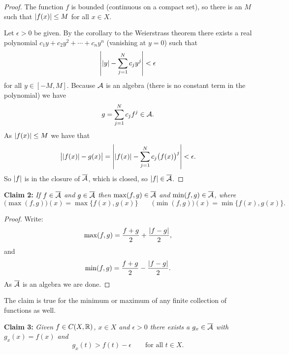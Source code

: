 \begin{proof}
The function $f$ is bounded (continuous on a compact set), so there is an $M$
such that $\lvert {f(x)} \rvert \leq M$ for all $x \in X$.

Let $\epsilon > 0$ be given.  By the corollary to the Weierstrass theorem there
exists a real polynomial $c_1 y + c_2 y^2 + \cdots+ c_n y^n$ (vanishing at
$y=0$) such that
\begin{equation*}
\left\lvert {\lvert {y} \rvert - \sum_{j=1}^N c_j y^j} \right\rvert < \epsilon
\end{equation*}
for all $y \in [-M,M]$.
Because ${\mathcal{A}}$ is an algebra (there is no constant term in the polynomial)
we have
\begin{equation*}
g = \sum_{j=1}^N c_j f^j \in {\mathcal{A}} .
\end{equation*}
As $\lvert {f(x)} \rvert \leq M$ we have that
\begin{equation*}
\bigl\lvert\lvert {f(x)} \rvert - g(x)\bigr\rvert
=
\left\lvert {\lvert {f(x)} \rvert - \sum_{j=1}^N c_j {\bigl(f(x)\bigr)}^j} \right\rvert
< \epsilon .
\end{equation*}
So $\lvert {f} \rvert$ is in the closure of $\overline{{\mathcal{A}}}$, which is closed, so $\lvert {f} \rvert \in
\overline{{\mathcal{A}}}$.
\end{proof}

\medskip

\noindent
\textbf{Claim 2:} \emph{If $f \in \overline{{\mathcal{A}}}$ and $g \in \overline{{\mathcal{A}}}$ then
$\max(f,g) \in \overline{{\mathcal{A}}}$ and
$\min(f,g) \in \overline{{\mathcal{A}}}$, where
}
\begin{equation*}
\bigl(\max(f,g)\bigr) (x) = \max \{ f(x), g(x) \} \qquad
\bigl(\min(f,g)\bigr) (x) = \min \{ f(x), g(x) \} .
\end{equation*}

\begin{proof}
Write:
\begin{equation*}
\max(f,g) = \frac{f+g}{2} + \frac{\lvert {f-g} \rvert}{2} ,
\end{equation*}
and
\begin{equation*}
\min(f,g) = \frac{f+g}{2} - \frac{\lvert {f-g} \rvert}{2} .
\end{equation*}
As $\overline{{\mathcal{A}}}$ is an algebra we are done.
\end{proof}

The claim is true for the minimum or maximum of any finite
collection of functions as well.

\medskip

\noindent
\textbf{Claim 3:} \emph{Given $f \in C(X,{\mathbb{R}})$, $x \in X$ and $\epsilon > 0$
there exists a $g_x \in \overline{{\mathcal{A}}}$ with $g_x(x) = f(x)$ and
}
\begin{equation*}
g_x(t) > f(t)-\epsilon \qquad \text{for all $t \in X$}.
\end{equation*}

